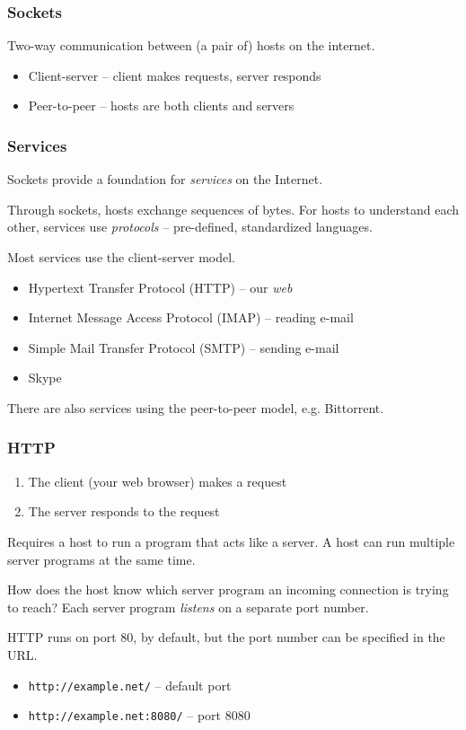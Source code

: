 \documentclass{beamer}
\begin{document}
	\begin{frame}
		\frametitle{Sockets}
		Two-way communication between (a pair of) hosts on the internet.

		\begin{itemize}
			\item Client-server -- client makes requests, server responds
			\item Peer-to-peer -- hosts are both clients and servers
		\end{itemize}
	\end{frame}

	\begin{frame}
		\frametitle{Services}
		Sockets provide a foundation for \emph{services} on the Internet.
		
		Through sockets, hosts exchange sequences of bytes. For hosts to understand each other, services use \emph{protocols} -- pre-defined, standardized languages.

		\pause
		Most services use the client-server model.

		\begin{itemize}
			\item Hypertext Transfer Protocol (HTTP) -- our \emph{web}
			\item Internet Message Access Protocol (IMAP) -- reading e-mail
			\item Simple Mail Transfer Protocol (SMTP) -- sending e-mail
			\item Skype
		\end{itemize}

		\pause
		There are also services using the peer-to-peer model, e.g. Bittorrent.
	\end{frame}

	\begin{frame}
		\frametitle{HTTP}

		\begin{enumerate}
			\item The client (your web browser) makes a request
			\item The server responds to the request
		\end{enumerate}

		Requires a host to run a program that acts like a server. A host can run multiple server programs at the same time.

		How does the host know which server program an incoming connection is trying to reach? Each server program \emph{listens} on a separate port number.
		
		HTTP runs on port 80, by default, but the port number can be specified in the URL.

		\begin{itemize}
			\item \texttt{http://example.net/} -- default port
			\item \texttt{http://example.net:8080/} -- port 8080
		\end{itemize}
	\end{frame}
\end{document}
